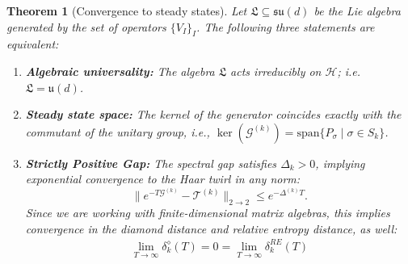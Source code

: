 \documentclass{article}
\newtheorem{theorem}{Theorem}
\theoremstyle{definition}
\begin{document}
    \begin{theorem}[Convergence to steady states]
        Let $\mathfrak{L}\subseteq \mathfrak{su}(d)$ be the Lie algebra generated
        by the set of operators $\{ V_{I}\}_{I}$. The following three statements
        are equivalent:
        \begin{enumerate}
            \item \textbf{Algebraic universality:} The algebra $\mathfrak{L}$
                acts irreducibly on $\mathcal{H}$; i.e.
                $\mathfrak{L}= \mathfrak{u}(d)$.

            \item \textbf{Steady state space:} The kernel of the generator
                coincides exactly with the commutant of the unitary group, i.e.,
                $\ker(\mathcal{G}^{(k)}) = \mathrm{span}\{P_{\sigma}\mid \sigma \in
                S_{k}\}$.

            \item \textbf{Strictly Positive Gap:} The spectral gap satisfies
                $\Delta_{k}> 0$, implying exponential convergence to the Haar twirl
                in any norm:
                \begin{equation}
                    \| e^{-T\mathcal{G}^{(k)}}- \mathcal{T}^{(k)}\|_{2\to2}\leq e
                    ^{-\Delta^{(k)} T}.
                \end{equation}
                Since we are working with finite-dimensional matrix algebras, this
                implies convergence in the diamond distance and relative entropy
                distance, as well:
                \begin{eqnarray}
                    \lim_{T\to \infty}\delta^{\diamond}_k(T)=0=\lim_{T\to \infty}\delta^{RE}_k(T)
                \end{eqnarray}
        \end{enumerate}
    \end{theorem}
\end{document}
